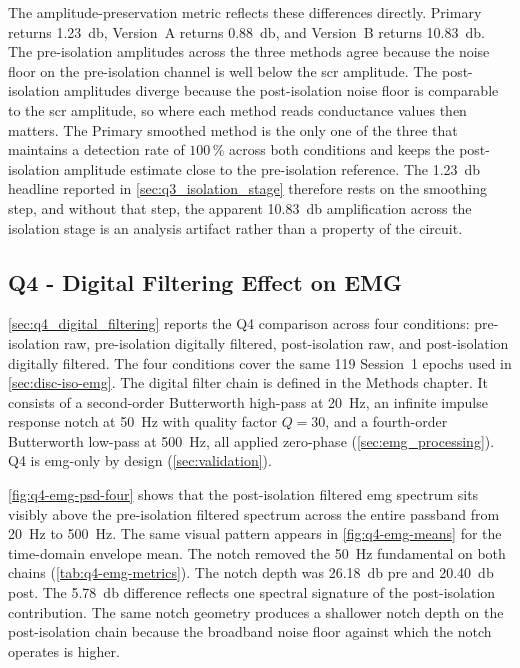 The amplitude-preservation metric reflects these differences directly. Primary returns \SI{+1.23}{\decibel}, Version~A returns \SI{+0.88}{\decibel}, and Version~B returns \SI{+10.83}{\decibel}. The pre-isolation amplitudes across the three methods agree because the noise floor on the pre-isolation channel is well below the \gls{scr} amplitude. The post-isolation amplitudes diverge because the post-isolation noise floor is comparable to the \gls{scr} amplitude, so where each method reads conductance values then matters. The Primary smoothed method is the only one of the three that maintains a detection rate of $\num{100}$\,\si{\percent} across both conditions and keeps the post-isolation amplitude estimate close to the pre-isolation reference. The \SI{+1.23}{\decibel} headline reported in \autoref{sec:q3_isolation_stage} therefore rests on the smoothing step, and without that step, the apparent \SI{+10.83}{\decibel} amplification across the isolation stage is an analysis artifact rather than a property of the circuit.

\FloatBarrier

\subsection{Q4 - Digital Filtering Effect on EMG}
\label{sec:disc-iso-digital-filter}

\autoref{sec:q4_digital_filtering} reports the Q4 comparison across four conditions: pre-isolation raw, pre-isolation digitally filtered, post-isolation raw, and post-isolation digitally filtered. The four conditions cover the same 119 Session~1 epochs used in \autoref{sec:disc-iso-emg}. The digital filter chain is defined in the Methods chapter. It consists of a second-order Butterworth high-pass at \SI{20}{\hertz}, an infinite impulse response notch at \SI{50}{\hertz} with quality factor \(Q = \num{30}\), and a fourth-order Butterworth low-pass at \SI{500}{\hertz}, all applied zero-phase (\autoref{sec:emg_processing}). Q4 is \gls{emg}-only by design (\autoref{sec:validation}).

\autoref{fig:q4-emg-psd-four} shows that the post-isolation filtered \gls{emg} spectrum sits visibly above the pre-isolation filtered spectrum across the entire passband from \SI{20}{\hertz} to \SI{500}{\hertz}. The same visual pattern appears in \autoref{fig:q4-emg-means} for the time-domain envelope mean. The notch removed the \SI{50}{\hertz} fundamental on both chains (\autoref{tab:q4-emg-metrics}). The notch depth was \SI{26.18}{\decibel} pre and \SI{20.40}{\decibel} post. The \SI{5.78}{\decibel} difference reflects one spectral signature of the post-isolation contribution. The same notch geometry produces a shallower notch depth on the post-isolation chain because the broadband noise floor against which the notch operates is higher.

